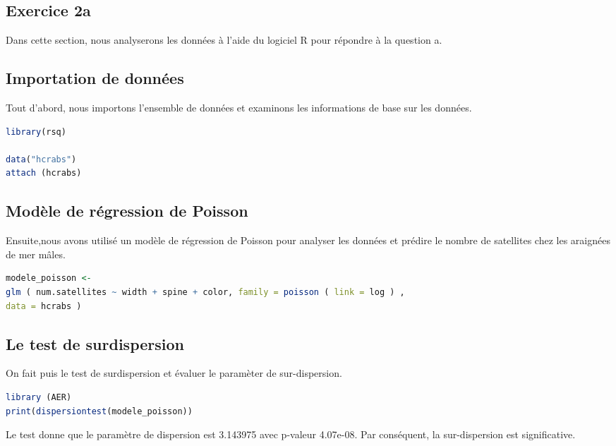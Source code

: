 \documentclass[../main.tex]{subfiles}
\begin{document}
\begin{CJK*}{UTF8}{gbsn}

\section*{Exercice 2a}

Dans cette section, nous analyserons les données à l'aide du logiciel R pour répondre à la question a.

\subsection*{Importation de données}

Tout d'abord, nous importons l'ensemble de données et examinons les informations de base sur les données.

\begin{lstlisting}[language=R]
library(rsq)

data("hcrabs")
attach (hcrabs)

\end{lstlisting}

\subsection*{Modèle de régression de Poisson}

Ensuite,nous avons utilisé un modèle de régression de Poisson pour analyser les données et prédire le nombre de satellites chez les araignées de mer mâles.

\begin{lstlisting}[language=R]
modele_poisson <- 
glm ( num.satellites ~ width + spine + color, family = poisson ( link = log ) ,
data = hcrabs ) 
\end{lstlisting}

\subsection*{Le test de surdispersion}

On fait puis le test de surdispersion et évaluer le paramèter de sur-dispersion.

\begin{lstlisting}[language=R]
library (AER)
print(dispersiontest(modele_poisson))
\end{lstlisting}

Le test donne que le paramètre de dispersion est 3.143975 avec p-valeur 4.07e-08.
Par conséquent, la sur-dispersion est significative.


\end{CJK*}
\end{document}
